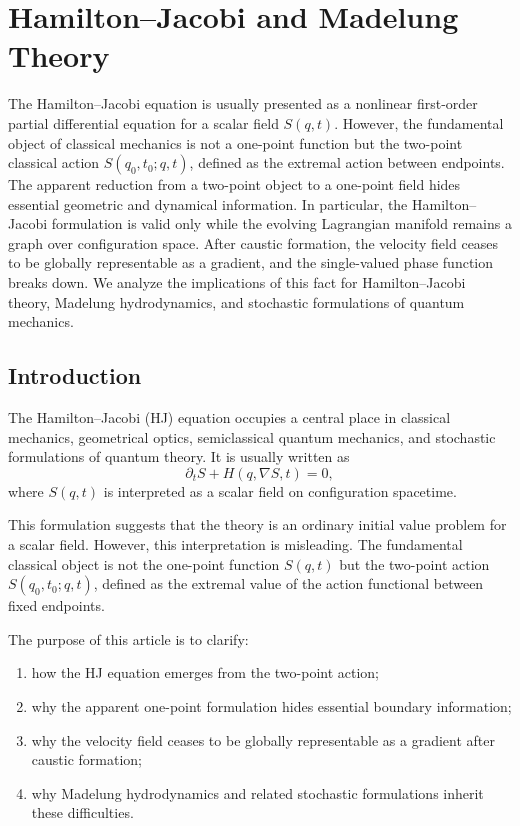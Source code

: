 \section{Hamilton--Jacobi and Madelung Theory}
The Hamilton--Jacobi equation is usually presented as a
nonlinear first-order partial differential equation for a scalar field
$S(q,t)$. However, the fundamental object of classical mechanics is not a
one-point function but the two-point classical action $S(q_0,t_0;q,t)$, defined
as the extremal action between endpoints. The apparent reduction from a
two-point object to a one-point field hides essential geometric and dynamical
information. In particular, the Hamilton--Jacobi formulation is valid only
while the evolving Lagrangian manifold remains a graph over configuration
space. After caustic formation, the velocity field ceases to be globally
representable as a gradient, and the single-valued phase function breaks down.
We analyze the implications of this fact for Hamilton--Jacobi theory, Madelung
hydrodynamics, and stochastic formulations of quantum mechanics.

\subsection{Introduction}

The Hamilton--Jacobi (HJ) equation occupies a central place in classical
mechanics, geometrical optics, semiclassical quantum mechanics, and stochastic
formulations of quantum theory. It is usually written as
\begin{equation}
\partial_t S + H(q,\nabla S,t)=0,
\label{HJ}
\end{equation}
where $S(q,t)$ is interpreted as a scalar field on configuration spacetime.

This formulation suggests that the theory is an ordinary initial value problem
for a scalar field. However, this interpretation is misleading. The fundamental
classical object is not the one-point function $S(q,t)$ but the two-point
action $S(q_0,t_0;q,t)$, defined as the extremal value of the action functional
between fixed endpoints.

The purpose of this article is to clarify:
\begin{enumerate}
\item how the HJ equation emerges from the two-point action;
\item why the apparent one-point formulation hides essential boundary
    information;
\item why the velocity field ceases to be globally representable as a gradient
    after caustic formation;
\item why Madelung hydrodynamics and related stochastic formulations inherit
    these difficulties.
\end{enumerate}

